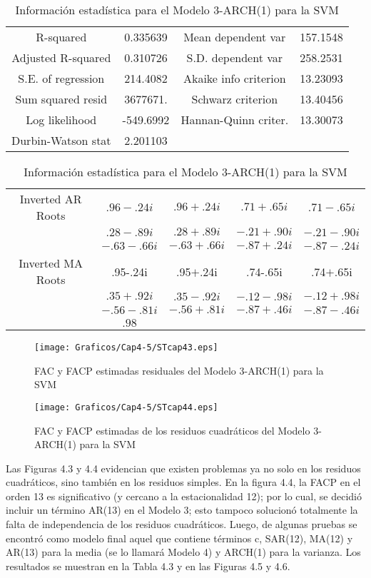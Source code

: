 \begin{table}[H]
\centering
\begin{tabular}{cccc}\hline\hline
R-squared& 0.335639& Mean dependent var & 157.1548 \\
Adjusted R-squared& 0.310726& S.D. dependent var& 258.2531 \\
S.E. of regression& 214.4082& Akaike info criterion & 13.23093 \\
Sum squared resid& 3677671.& Schwarz criterion & 13.40456 \\
Log likelihood& -549.6992& Hannan-Quinn criter. & 13.30073 \\
Durbin-Watson stat& 2.201103& \\ \hline\hline
\end{tabular}

\begin{tabular}{ccccc} \hline\hline
Inverted AR Roots& $.96-.24i$& $.96+.24i$& $.71+.65i$& $.71-.65i$ \\
& $.28-.89i$& $.28+.89i$& $-.21+.90i$& $-.21-.90i$ \\
& $-.63-.66i$& $-.63+.66i$& $-.87+.24i$& $-.87-.24i$ \\
Inverted MA Roots& .95-.24i& .95$+$.24i& .74-.65i& .74$+$.65i \\
& $.35+.92i$& $.35-.92i$& $-.12-.98i$& $-.12+.98i$ \\
& $-.56-.81i$& $-.56+.81i$& $-.87+.46i$& $-.87-.46i$ \\
& $.98$ & &  \\ \hline\hline
\end{tabular}
\caption{Informaci\'{o}n estad\'{i}stica para el Modelo 3-ARCH(1) para la SVM}
\end{table}


\begin{figure}[H]
\centering
\texttt{[image: Graficos/Cap4-5/STcap43.eps]}
\caption{FAC y FACP estimadas residuales del Modelo 3-ARCH(1) para la SVM}
\end{figure}

\begin{figure}[H]
\centering
\texttt{[image: Graficos/Cap4-5/STcap44.eps]}
\caption{FAC y FACP estimadas de los residuos cuadr\'{a}ticos del Modelo 3-ARCH(1) para la SVM}
\end{figure}

Las Figuras 4.3 y 4.4 evidencian que existen problemas ya no solo en los residuos cuadr\'{a}ticos, sino tambi\'{e}n en los residuos simples. En la figura 4.4, la FACP en el orden 13 es significativo (y cercano a la estacionalidad 12); por lo cual, se decidi\'{o} incluir un t\'{e}rmino AR(13) en el Modelo 3; esto tampoco solucion\'{o} totalmente la falta de independencia de los residuos cuadr\'{a}ticos. Luego, de algunas pruebas se encontr\'{o} como modelo final aquel que contiene t\'{e}rminos c, SAR(12), MA(12) y AR(13) para la media (se lo llamar\'{a} Modelo 4) y ARCH(1) para la varianza. Los resultados se muestran en la Tabla 4.3 y en las Figuras 4.5 y 4.6.

